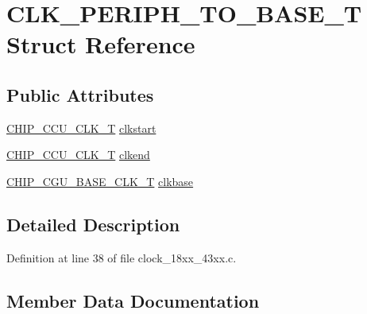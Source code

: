 \hypertarget{struct_c_l_k___p_e_r_i_p_h___t_o___b_a_s_e___t}{}\section{C\+L\+K\+\_\+\+P\+E\+R\+I\+P\+H\+\_\+\+T\+O\+\_\+\+B\+A\+S\+E\+\_\+T Struct Reference}
\label{struct_c_l_k___p_e_r_i_p_h___t_o___b_a_s_e___t}
\subsection*{Public Attributes}
\begin{DoxyCompactItemize}
\item 
\hyperlink{chip__clocks_8h_a45bb23228b9831321626c103ada7c60b}{C\+H\+I\+P\+\_\+\+C\+C\+U\+\_\+\+C\+L\+K\+\_\+T} \hyperlink{struct_c_l_k___p_e_r_i_p_h___t_o___b_a_s_e___t_a167ff25462aba1b7e173f3b59ff9d46f}{clkstart}
\item 
\hyperlink{chip__clocks_8h_a45bb23228b9831321626c103ada7c60b}{C\+H\+I\+P\+\_\+\+C\+C\+U\+\_\+\+C\+L\+K\+\_\+T} \hyperlink{struct_c_l_k___p_e_r_i_p_h___t_o___b_a_s_e___t_aff1764d78ef6484350cd8ff2ce5e7b11}{clkend}
\item 
\hyperlink{chip__clocks_8h_a31e266dd83cc66eb866d8d051ffd1d45}{C\+H\+I\+P\+\_\+\+C\+G\+U\+\_\+\+B\+A\+S\+E\+\_\+\+C\+L\+K\+\_\+T} \hyperlink{struct_c_l_k___p_e_r_i_p_h___t_o___b_a_s_e___t_ac78eeefa3c9e39f4c658ece9d763f21b}{clkbase}
\end{DoxyCompactItemize}


\subsection{Detailed Description}


Definition at line 38 of file clock\+\_\+18xx\+\_\+43xx.\+c.



\subsection{Member Data Documentation}
\mbox{\label{struct_c_l_k___p_e_r_i_p_h___t_o___b_a_s_e___t_ac78eeefa3c9e39f4c658ece9d763f21b}} 
